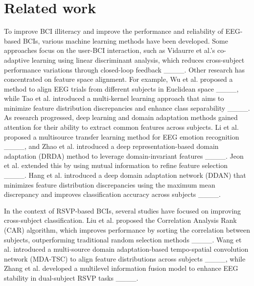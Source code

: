 \section{Related work}
To improve BCI illiteracy and improve the performance and reliability of EEG-based BCIs, various machine learning methods have been developed. Some approaches focus on the user-BCI interaction, such as Vidaurre et al.'s co-adaptive learning using linear discriminant analysis, which reduces cross-subject performance variations through closed-loop feedback ____. Other research has concentrated on feature space alignment. For example, Wu et al. proposed a method to align EEG trials from different subjects in Euclidean space ____, while Tao et al. introduced a multi-kernel learning approach that aims to minimize feature distribution discrepancies and enhance class separability ____. As research progressed, deep learning and domain adaptation methods gained attention for their ability to extract common features across subjects. Li et al. proposed a multisource transfer learning method for EEG emotion recognition ____, and Zhao et al. introduced a deep representation-based domain adaptation (DRDA) method to leverage domain-invariant features ____. Jeon et al. extended this by using mutual information to refine feature selection ____. Hang et al. introduced a deep domain adaptation network (DDAN) that minimizes feature distribution discrepancies using the maximum mean discrepancy and improves classification accuracy across subjects ____.

In the context of RSVP-based BCIs, several studies have focused on improving cross-subject classification. Liu et al. proposed the Correlation Analysis Rank (CAR) algorithm, which improves performance by sorting the correlation between subjects, outperforming traditional random selection methods ____. Wang et al. introduced a multi-source domain adaptation-based tempo-spatial convolution network (MDA-TSC) to align feature distributions across subjects ____, while Zhang et al. developed a multilevel information fusion model to enhance EEG stability in dual-subject RSVP tasks ____.

